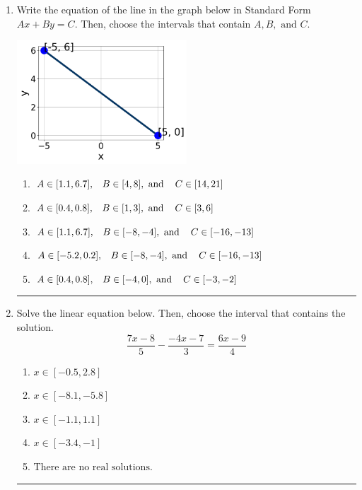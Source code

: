 \documentclass[14pt]{extbook}
\newcommand{\litem}[1]{\item#1\hspace*{-1cm}\rule{\textwidth}{0.4pt}}
\begin{document}
\begin{enumerate}
{\begin{enumerate}[label=\Alph*.]
\end{enumerate} }
\litem{
Write the equation of the line in the graph below in Standard Form $Ax+By=C$. Then, choose the intervals that contain $A, B, \text{ and } C$.
\begin{center}
    \includegraphics[width=0.5\textwidth]{../Figures/linearGraphToStandardCopyB.png}
\end{center}
\begin{enumerate}[label=\Alph*.]
\item \( A \in [1.1, 6.7], \hspace{3mm} B \in [4, 8], \text{ and } \hspace{3mm} C \in [14, 21] \)
\item \( A \in [0.4, 0.8], \hspace{3mm} B \in [1, 3], \text{ and } \hspace{3mm} C \in [3, 6] \)
\item \( A \in [1.1, 6.7], \hspace{3mm} B \in [-8, -4], \text{ and } \hspace{3mm} C \in [-16, -13] \)
\item \( A \in [-5.2, 0.2], \hspace{3mm} B \in [-8, -4], \text{ and } \hspace{3mm} C \in [-16, -13] \)
\item \( A \in [0.4, 0.8], \hspace{3mm} B \in [-4, 0], \text{ and } \hspace{3mm} C \in [-3, -2] \)

\end{enumerate} }
\litem{
Solve the linear equation below. Then, choose the interval that contains the solution.\[ \frac{7x -8}{5} - \frac{-4x -7}{3} = \frac{6x -9}{4} \]\begin{enumerate}[label=\Alph*.]
\item \( x \in [-0.5, 2.8] \)
\item \( x \in [-8.1, -5.8] \)
\item \( x \in [-1.1, 1.1] \)
\item \( x \in [-3.4, -1] \)
\item \( \text{There are no real solutions.} \)


\end{enumerate}}
\end{enumerate}
\end{document}
